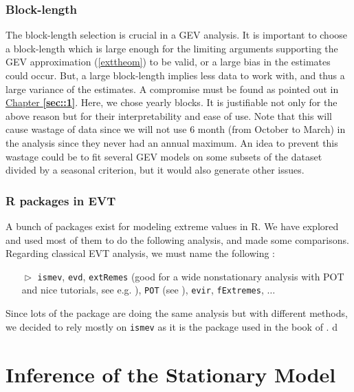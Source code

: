 \subsubsection*{Block-length } 

The block-length selection is crucial in a GEV analysis. It is important to choose a block-length which is large enough for the limiting arguments supporting the GEV approximation (\ref{exttheom}) to be valid, or a large bias in the estimates could occur. But, a large block-length implies less data to work with, and thus a large variance of the estimates. A compromise must be found as pointed out in \hyperref[sec::1]{Chapter \textbf{\ref{sec::1}}}. Here, we chose yearly blocks. It is justifiable not only for the above reason but for their interpretability and ease of use.
Note that this will cause wastage of data since we will not use 6 month (from October to March) in the analysis since they never had an annual maximum. 
An idea to prevent this wastage could be to fit several GEV models on some subsets of the dataset divided by a seasonal criterion, but it would also generate other issues. 



\subsubsection*{R packages in EVT}

A bunch of packages exist for modeling extreme values in R. We have explored and used most of them to do the following analysis, and made some comparisons. Regarding classical EVT analysis, we must name the following : 

\begin{itemize}
	\item[$\vartriangleright$] \texttt{ismev}, \texttt{evd}, \texttt{extRemes} (good for a wide nonstationary analysis with POT and nice tutorials, see e.g. \citet{gilleland_extremes_2016}), \texttt{POT} (see \citet{ribatet_users_2006}), \texttt{evir}, \texttt{fExtremes}, $\dots$
\end{itemize}
Since lots of the package are doing the same analysis but with different methods, we decided to rely mostly on \texttt{ismev} as it is the package used in the book of \citet{coles_introduction_2001}.
d

\section{Inference of the Stationary Model}\label{sec:xpstatio}

